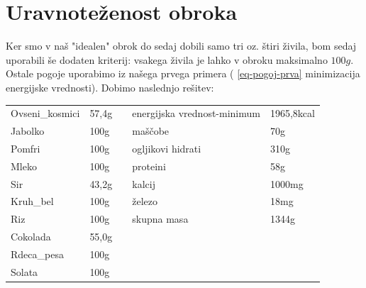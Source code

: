 \documentclass[slovene,11pt,a4paper]{article}
\numberwithin{equation}{section} %
\numberwithin{figure}{section} %
\numberwithin{table}{section} %
\begin{document}
\section{Uravnoteženost obroka}
Ker smo v naš "idealen" obrok do sedaj dobili samo tri oz. štiri živila, bom sedaj uporabili še dodaten kriterij: vsakega živila je lahko v obroku maksimalno $100g$. Ostale pogoje uporabimo iz našega prvega primera ( \ref{eq-pogoj-prva} minimizacija energijske vrednosti). Dobimo naslednjo rešitev:
\begin{table}[!h]
\centering
\begin{tabular}{|l|l|lll}
\cline{1-2} \cline{4-5}
Ovseni\_kosmici & 57,4g & \multicolumn{1}{l|}{} & \multicolumn{1}{l|}{energijska vrednost-minimum} & \multicolumn{1}{l|}{1965,8kcal} \\ \cline{1-2} \cline{4-5} 
Jabolko         & 100g  & \multicolumn{1}{l|}{} & \multicolumn{1}{l|}{maščobe}                     & \multicolumn{1}{l|}{70g}        \\ \cline{1-2} \cline{4-5} 
Pomfri          & 100g  & \multicolumn{1}{l|}{} & \multicolumn{1}{l|}{ogljikovi hidrati}           & \multicolumn{1}{l|}{310g}       \\ \cline{1-2} \cline{4-5} 
Mleko           & 100g  & \multicolumn{1}{l|}{} & \multicolumn{1}{l|}{proteini}                    & \multicolumn{1}{l|}{58g}        \\ \cline{1-2} \cline{4-5} 
Sir             & 43,2g & \multicolumn{1}{l|}{} & \multicolumn{1}{l|}{kalcij}                      & \multicolumn{1}{l|}{1000mg}     \\ \cline{1-2} \cline{4-5} 
Kruh\_bel       & 100g  & \multicolumn{1}{l|}{} & \multicolumn{1}{l|}{železo}                      & \multicolumn{1}{l|}{18mg}       \\ \cline{1-2} \cline{4-5} 
Riz             & 100g  & \multicolumn{1}{l|}{} & \multicolumn{1}{l|}{skupna masa}                 & \multicolumn{1}{l|}{1344g}      \\ \cline{1-2} \cline{4-5} 
Cokolada        & 55,0g &                       &                                                  &                                 \\ \cline{1-2}
Rdeca\_pesa     & 100g  &                       &                                                  &                                 \\ \cline{1-2}
Solata          & 100g  &                       &                                                  &                                 \\ \cline{1-2}

\end{tabular}
\end{table}
\end{document}
